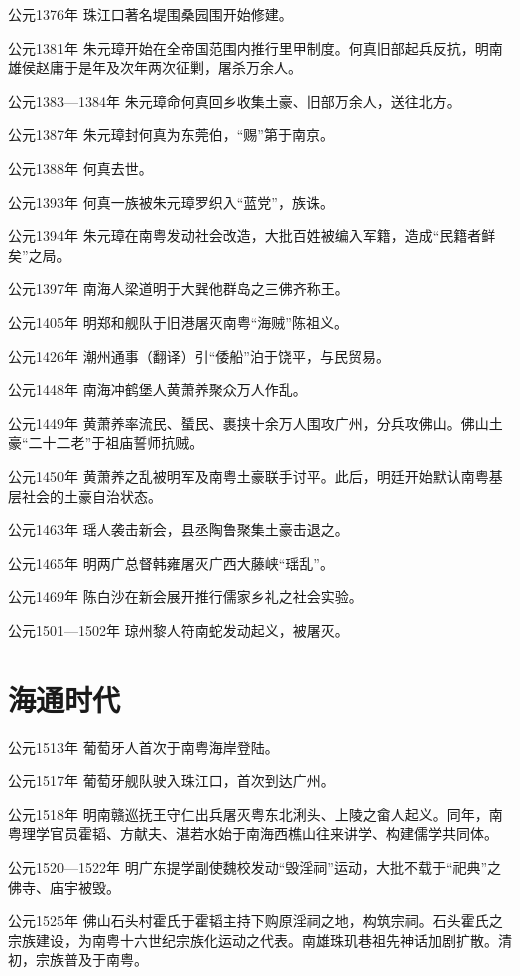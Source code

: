公元1376年 珠江口著名堤围桑园围开始修建。

公元1381年 朱元璋开始在全帝国范围内推行里甲制度。何真旧部起兵反抗，明南雄侯赵庸于是年及次年两次征剿，屠杀万余人。

公元1383—1384年 朱元璋命何真回乡收集土豪、旧部万余人，送往北方。

公元1387年 朱元璋封何真为东莞伯，“赐”第于南京。

公元1388年 何真去世。

公元1393年 何真一族被朱元璋罗织入“蓝党”，族诛。

公元1394年 朱元璋在南粤发动社会改造，大批百姓被编入军籍，造成“民籍者鲜矣”之局。

公元1397年 南海人梁道明于大巽他群岛之三佛齐称王。

公元1405年 明郑和舰队于旧港屠灭南粤“海贼”陈祖义。

公元1426年 潮州通事（翻译）引“倭船”泊于饶平，与民贸易。

公元1448年 南海冲鹤堡人黄萧养聚众万人作乱。

公元1449年 黄萧养率流民、蜑民、裹挟十余万人围攻广州，分兵攻佛山。佛山土豪“二十二老”于祖庙誓师抗贼。

公元1450年 黄萧养之乱被明军及南粤土豪联手讨平。此后，明廷开始默认南粤基层社会的土豪自治状态。

公元1463年 瑶人袭击新会，县丞陶鲁聚集土豪击退之。

公元1465年 明两广总督韩雍屠灭广西大藤峡“瑶乱”。

公元1469年 陈白沙在新会展开推行儒家乡礼之社会实验。

公元1501—1502年 琼州黎人符南蛇发动起义，被屠灭。

\section*{海通时代}

公元1513年 葡萄牙人首次于南粤海岸登陆。

公元1517年 葡萄牙舰队驶入珠江口，首次到达广州。

公元1518年 明南赣巡抚王守仁出兵屠灭粤东北浰头、上陵之畲人起义。同年，南粤理学官员霍韬、方献夫、湛若水始于南海西樵山往来讲学、构建儒学共同体。

公元1520—1522年 明广东提学副使魏校发动“毁淫祠”运动，大批不载于“祀典”之佛寺、庙宇被毁。

公元1525年 佛山石头村霍氏于霍韬主持下购原淫祠之地，构筑宗祠。石头霍氏之宗族建设，为南粤十六世纪宗族化运动之代表。南雄珠玑巷祖先神话加剧扩散。清初，宗族普及于南粤。

